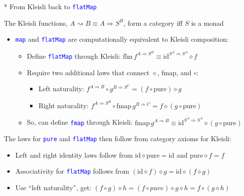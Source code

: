 \documentclass[english]{beamer}
\begin{document}
\begin{frame}{{*} From Kleisli back to \texttt{\textcolor{blue}{\footnotesize{}flatMap}} }

The Kleisli functions, $A\rightsquigarrow B\equiv A\Rightarrow S^{B}$,
form a category iff $S$ is a monad 
\begin{itemize}
\item \texttt{\textcolor{blue}{\footnotesize{}map}} and \texttt{\textcolor{blue}{\footnotesize{}flatMap}}
are computationally equivalent to Kleisli composition:
\begin{itemize}
\item Define \texttt{\textcolor{blue}{\footnotesize{}flatMap}} through Kleisli:{\small{}
$\text{flm}\,f^{A\Rightarrow S^{B}}\equiv\text{id}^{S^{A}\Rightarrow S^{A}}\diamond f$}{\small \par}
\item Require two additional laws that connect $\diamond$, $\text{fmap}$,
and $\circ$:
\begin{itemize}
\item Left naturality: {\small{}$f^{A\Rightarrow B}\circ g^{B\Rightarrow S^{C}}=\left(f\circ\text{pure}\right)\diamond g$}{\small \par}
\item Right naturality: {\small{}$f^{A\Rightarrow S^{B}}\circ\text{fmap}\,g^{B\Rightarrow C}=f\diamond\left(g\circ\text{pure}\right)$}{\small \par}
\end{itemize}
\item So, can define \texttt{\textcolor{blue}{\footnotesize{}fmap}} through
Kleisli: $\text{fmap}\,g^{A\Rightarrow B}\equiv\text{id}^{S^{A}\Rightarrow S^{A}}\diamond\left(g\circ\text{pure}\right)$
\end{itemize}
\end{itemize}
The laws for \texttt{\textcolor{blue}{\footnotesize{}pure}} and \texttt{\textcolor{blue}{\footnotesize{}flatMap}}
then follow from category axioms for Kleisli:
\begin{itemize}
\item Left and right identity laws follow from $\text{id}\diamond\text{pure}=\text{id}$
and $\text{pure}\diamond f=f$ 
\item Associativity for \texttt{\textcolor{blue}{\footnotesize{}flatMap}}
follows from $\left(\text{id}\diamond f\right)\diamond g=\text{id}\diamond\left(f\diamond g\right)$
\item Use ``left naturality'', get: $\left(f\circ g\right)\diamond h=\left(f\circ pure\right)\diamond g\diamond h=f\circ\left(g\diamond h\right)$

\end{itemize}
\end{frame}
\end{document}
